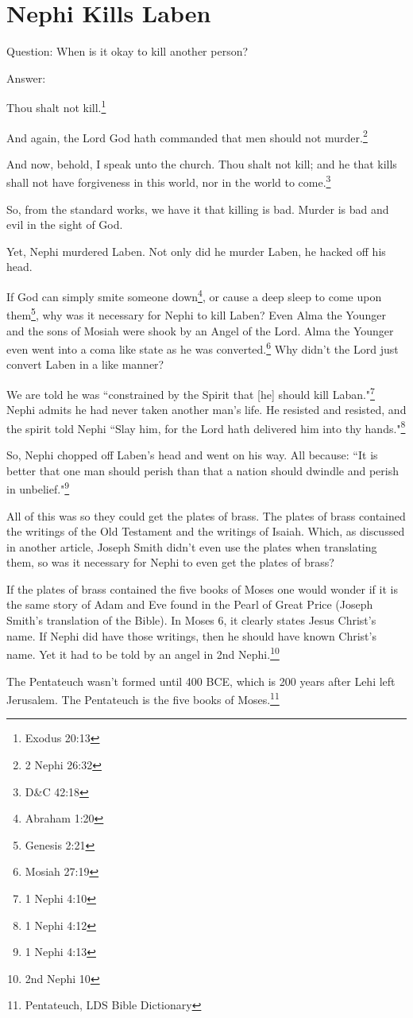 \chapter{Nephi Kills Laben}

Question: When is it okay to kill another person?

Answer:

\begin{displayquote}
Thou shalt not kill.\footnote{Exodus 20:13}
\end{displayquote}

\begin{displayquote}
And again, the Lord God hath commanded that men should not 
murder.\footnote{2 Nephi 26:32}
\end{displayquote}

\begin{displayquote}
And now, behold, I speak unto the church. Thou shalt not kill; 
and he that kills shall not have forgiveness in this world, nor in the 
world to come.\footnote{D\&C 42:18}
\end{displayquote}

So, from the standard works, we have it that killing is bad. Murder is bad and evil
in the sight of God.

Yet, Nephi murdered Laben. Not only did he murder Laben, he hacked off his head.

If God can simply smite someone down\footnote{Abraham 1:20}, or cause a deep sleep 
to come upon them\footnote{Genesis 2:21}, why was it necessary for Nephi to kill 
Laben? Even Alma the Younger and the sons of Mosiah were shook by an Angel of the 
Lord. Alma the Younger even went into a coma like state as he was 
converted.\footnote{Mosiah 27:19} Why didn't the Lord just convert Laben in a like 
manner?

We are told he was ``constrained by the Spirit that [he] should kill 
Laban."\footnote{1 Nephi 4:10} Nephi admits he had never taken
another man's life. He resisted and resisted, and the spirit told Nephi ``Slay him,
for the Lord hath delivered him into thy hands."\footnote{1 Nephi 4:12}

So, Nephi chopped off Laben's head and went on his way. All because: ``It is better
that one man should perish than that a nation should dwindle and perish in
unbelief."\footnote{1 Nephi 4:13}

All of this was so they could get the plates of brass. The plates of brass contained
the writings of the Old Testament and the writings of Isaiah. Which, as discussed in
another article, Joseph Smith didn't even use the plates when translating them, so
was it necessary for Nephi to even get the plates of brass?

If the plates of brass contained the five books of Moses one would wonder if it is
the same story of Adam and Eve found in the Pearl of Great Price (Joseph Smith's
translation of the Bible). In Moses 6, it clearly states Jesus Christ's name. If
Nephi did have those writings, then he should have known Christ's name. Yet it
had to be told by an angel in 2nd Nephi.\footnote{2nd Nephi 10}

The Pentateuch wasn't formed until 400 BCE, which is 200 years after Lehi left
Jerusalem. The Pentateuch is the five books of Moses.\footnote{Pentateuch, LDS
Bible Dictionary}

